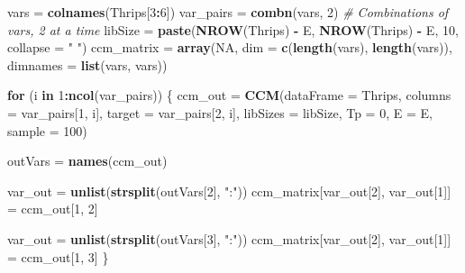\documentclass[]{article}
\newenvironment{Shaded}{\begin{snugshade}}{\end{snugshade}}
\newcommand{\CommentTok}[1]{\textcolor[rgb]{0.56,0.35,0.01}{\textit{#1}}}
\newcommand{\ControlFlowTok}[1]{\textcolor[rgb]{0.13,0.29,0.53}{\textbf{#1}}}
\newcommand{\DataTypeTok}[1]{\textcolor[rgb]{0.13,0.29,0.53}{#1}}
\newcommand{\DecValTok}[1]{\textcolor[rgb]{0.00,0.00,0.81}{#1}}
\newcommand{\KeywordTok}[1]{\textcolor[rgb]{0.13,0.29,0.53}{\textbf{#1}}}
\newcommand{\NormalTok}[1]{#1}
\newcommand{\OperatorTok}[1]{\textcolor[rgb]{0.81,0.36,0.00}{\textbf{#1}}}
\newcommand{\OtherTok}[1]{\textcolor[rgb]{0.56,0.35,0.01}{#1}}
\newcommand{\StringTok}[1]{\textcolor[rgb]{0.31,0.60,0.02}{#1}}
\begin{document}
\begin{Shaded}
\begin{Highlighting}[]
\NormalTok{vars =}\StringTok{ }\KeywordTok{colnames}\NormalTok{(Thrips[}\DecValTok{3}\OperatorTok{:}\DecValTok{6}\NormalTok{])}
\NormalTok{var_pairs =}\StringTok{ }\KeywordTok{combn}\NormalTok{(vars, }\DecValTok{2}\NormalTok{)  }\CommentTok{# Combinations of vars, 2 at a time}
\NormalTok{libSize =}\StringTok{ }\KeywordTok{paste}\NormalTok{(}\KeywordTok{NROW}\NormalTok{(Thrips) }\OperatorTok{-}\StringTok{ }\NormalTok{E, }\KeywordTok{NROW}\NormalTok{(Thrips) }\OperatorTok{-}\StringTok{ }\NormalTok{E, }\DecValTok{10}\NormalTok{, }\DataTypeTok{collapse =} \StringTok{" "}\NormalTok{)}
\NormalTok{ccm_matrix =}\StringTok{ }\KeywordTok{array}\NormalTok{(}\OtherTok{NA}\NormalTok{, }\DataTypeTok{dim =} \KeywordTok{c}\NormalTok{(}\KeywordTok{length}\NormalTok{(vars), }\KeywordTok{length}\NormalTok{(vars)), }\DataTypeTok{dimnames =} \KeywordTok{list}\NormalTok{(vars, }
\NormalTok{    vars))}

\ControlFlowTok{for}\NormalTok{ (i }\ControlFlowTok{in} \DecValTok{1}\OperatorTok{:}\KeywordTok{ncol}\NormalTok{(var_pairs)) \{}
\NormalTok{    ccm_out =}\StringTok{ }\KeywordTok{CCM}\NormalTok{(}\DataTypeTok{dataFrame =}\NormalTok{ Thrips, }\DataTypeTok{columns =}\NormalTok{ var_pairs[}\DecValTok{1}\NormalTok{, i], }\DataTypeTok{target =}\NormalTok{ var_pairs[}\DecValTok{2}\NormalTok{, }
\NormalTok{        i], }\DataTypeTok{libSizes =}\NormalTok{ libSize, }\DataTypeTok{Tp =} \DecValTok{0}\NormalTok{, }\DataTypeTok{E =}\NormalTok{ E, }\DataTypeTok{sample =} \DecValTok{100}\NormalTok{)}
    
\NormalTok{    outVars =}\StringTok{ }\KeywordTok{names}\NormalTok{(ccm_out)}
    
\NormalTok{    var_out =}\StringTok{ }\KeywordTok{unlist}\NormalTok{(}\KeywordTok{strsplit}\NormalTok{(outVars[}\DecValTok{2}\NormalTok{], }\StringTok{":"}\NormalTok{))}
\NormalTok{    ccm_matrix[var_out[}\DecValTok{2}\NormalTok{], var_out[}\DecValTok{1}\NormalTok{]] =}\StringTok{ }\NormalTok{ccm_out[}\DecValTok{1}\NormalTok{, }\DecValTok{2}\NormalTok{]}
    
\NormalTok{    var_out =}\StringTok{ }\KeywordTok{unlist}\NormalTok{(}\KeywordTok{strsplit}\NormalTok{(outVars[}\DecValTok{3}\NormalTok{], }\StringTok{":"}\NormalTok{))}
\NormalTok{    ccm_matrix[var_out[}\DecValTok{2}\NormalTok{], var_out[}\DecValTok{1}\NormalTok{]] =}\StringTok{ }\NormalTok{ccm_out[}\DecValTok{1}\NormalTok{, }\DecValTok{3}\NormalTok{]}
\NormalTok{\}}
\end{Highlighting}
\end{Shaded}
\end{document}
